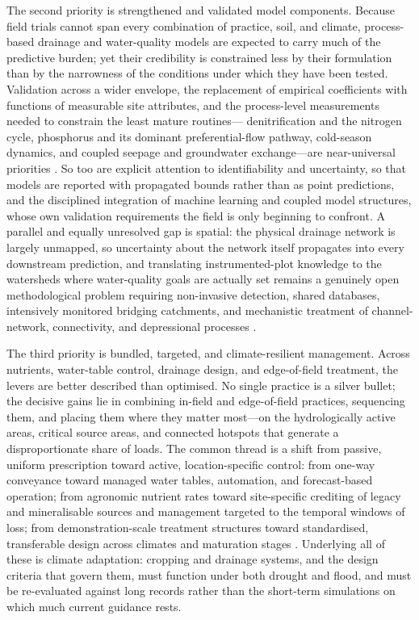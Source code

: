 \documentclass[11pt]{article}
\begin{document}
The second priority is strengthened and validated model components. Because
field trials cannot span every combination of practice, soil, and climate,
process-based drainage and water-quality models are expected to carry much
of the predictive burden; yet their credibility is constrained less by their
formulation than by the narrowness of the conditions under which they have
been tested. Validation across a wider envelope, the replacement of
empirical coefficients with functions of measurable site attributes, and the
process-level measurements needed to constrain the least mature routines---
denitrification and the nitrogen cycle, phosphorus and its dominant
preferential-flow pathway, cold-season dynamics, and coupled seepage and
groundwater exchange---are near-universal priorities \parencite{Youssef2006,Radcliffe2015}. So too are explicit
attention to identifiability and uncertainty, so that models are reported
with propagated bounds rather than as point predictions, and the disciplined
integration of machine learning and coupled model structures, whose own
validation requirements the field is only beginning to confront. A parallel
and equally unresolved gap is spatial: the physical drainage network is
largely unmapped, so uncertainty about the network itself propagates into
every downstream prediction, and translating instrumented-plot knowledge to
the watersheds where water-quality goals are actually set remains a genuinely
open methodological problem requiring non-invasive detection, shared
databases, intensively monitored bridging catchments, and mechanistic
treatment of channel-network, connectivity, and depressional processes \parencite{Amado2018,Naz2009}.

The third priority is bundled, targeted, and climate-resilient management.
Across nutrients, water-table control, drainage design, and edge-of-field
treatment, the levers are better described than optimised. No single practice
is a silver bullet; the decisive gains lie in combining in-field and
edge-of-field practices, sequencing them, and placing them where they matter
most---on the hydrologically active areas, critical source areas, and
connected hotspots that generate a disproportionate share of loads. The
common thread is a shift from passive, uniform prescription toward active,
location-specific control: from one-way conveyance toward managed water
tables, automation, and forecast-based operation; from agronomic nutrient
rates toward site-specific crediting of legacy and mineralisable sources and
management targeted to the temporal windows of loss; from demonstration-scale
treatment structures toward standardised, transferable design across
climates and maturation stages \parencite{Randall2001,Strock2011,Christianson2021}. Underlying all of these is climate
adaptation: cropping and drainage systems, and the design criteria that
govern them, must function under both drought and flood, and must be
re-evaluated against long records rather than the short-term simulations on
which much current guidance rests.
\end{document}
